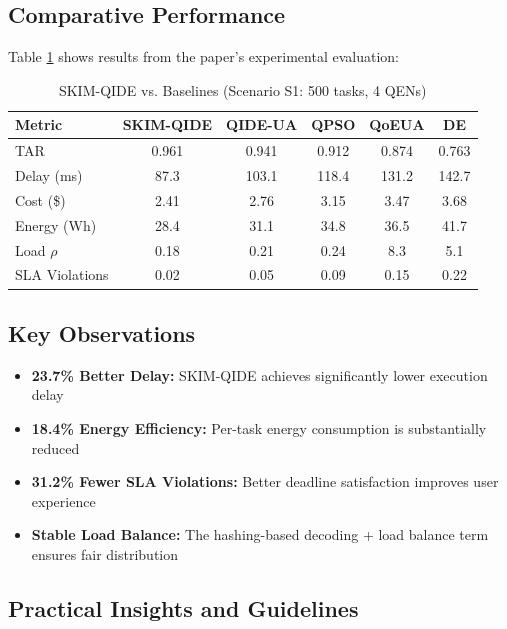 \documentclass[12pt,a4paper]{article}
\begin{document}
\subsection{Comparative Performance}

Table \ref{tab:comparison} shows results from the paper's experimental evaluation:

\begin{table}[H]
\centering
\caption{SKIM-QIDE vs. Baselines (Scenario S1: 500 tasks, 4 QENs)}
\label{tab:comparison}
\begin{tabular}{|l|c|c|c|c|c|}
\hline
Metric & SKIM-QIDE & QIDE-UA & QPSO & QoEUA & DE \\
\hline
TAR & 0.961 & 0.941 & 0.912 & 0.874 & 0.763 \\
\hline
Delay (ms) & 87.3 & 103.1 & 118.4 & 131.2 & 142.7 \\
\hline
Cost (\$) & 2.41 & 2.76 & 3.15 & 3.47 & 3.68 \\
\hline
Energy (Wh) & 28.4 & 31.1 & 34.8 & 36.5 & 41.7 \\
\hline
Load $\rho$ & 0.18 & 0.21 & 0.24 & 8.3 & 5.1 \\
\hline
SLA Violations & 0.02 & 0.05 & 0.09 & 0.15 & 0.22 \\
\hline
\end{tabular}
\end{table}

\subsection{Key Observations}

\begin{itemize}
  \item \textbf{23.7\% Better Delay:} SKIM-QIDE achieves significantly lower execution delay
  \item \textbf{18.4\% Energy Efficiency:} Per-task energy consumption is substantially reduced
  \item \textbf{31.2\% Fewer SLA Violations:} Better deadline satisfaction improves user experience
  \item \textbf{Stable Load Balance:} The hashing-based decoding + load balance term ensures fair distribution
\end{itemize}

\subsection{Practical Insights and Guidelines}
\end{document}
